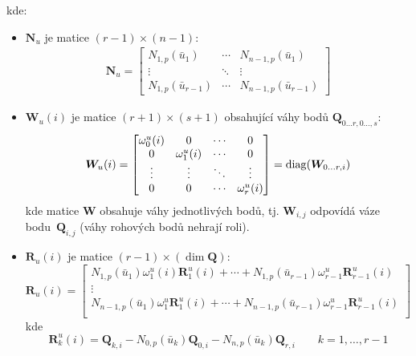 kde:
\begin{itemize}
    \item $\bm{N}_u$ je matice $(r - 1) \times (n - 1)$:
          \begin{align}
              \bm{N}_u = \begin{bmatrix}
                             N_{1,p}(\bar{u}_1)        & \cdots & N_{n-1,p}(\bar{u}_1)     \\
                             \vdots                    & \ddots & \vdots                   \\
                             N_{1, p}(\bar{u}_{r - 1}) & \cdots & N_{n-1,p}(\bar{u}_{r-1})
                         \end{bmatrix}
          \end{align}
    \item $\bm{W}_u(i)$ je matice $(r + 1)\times(s + 1)$ obsahující váhy
          bodů $\bm{Q}_{0\ldots r, 0 \ldots,s}$:
          \begin{align}
              \bm{W}_u(i)
              = \begin{bmatrix}
                    \omega^u_0(i) & 0             & \cdots & 0               \\
                    0             & \omega^u_1(i) & \cdots & 0               \\
                    \vdots        & \vdots        & \ddots & \vdots          \\
                    0             & 0             & \cdots & \omega^u_{r}(i)
                \end{bmatrix}
              = \operatorname{diag}(\bm{W}_{0\ldots r, i})
          \end{align}
          kde matice $\bm{W}$ obsahuje váhy jednotlivých bodů, tj.
          $\bm{W}_{i,j}$ odpovídá váze bodu~$\bm{Q}_{i,j}$
          (váhy rohových bodů nehrají roli).
    \item $\bm{R}_u(i)$ je matice $(r - 1) \times(\dim\bm{Q})$:
          \begin{equation}
              \bm{R}_u(i) =
              \begin{bmatrix}
                  N_{1,p}(\bar{u}_1)\omega^u_1(i)\bm{R}^u_1(i) + \cdots + N_{1, p}(\bar{u}_{r - 1})\omega^u_{r-1}\bm{R}^u_{r - 1}(i) \\
                  \vdots                                                                                                             \\
                  N_{n-1,p}(\bar{u}_1)\omega^u_1\bm{R}^u_1(i) + \cdots + N_{n-1, p}(\bar{u}_{r - 1})\omega^u_{r-1}\bm{R}^u_{r- 1}(i) \\
              \end{bmatrix}
          \end{equation}
          kde
          \begin{equation}
              \bm{R}^u_k(i)  = \bm{Q}_{k,i} - N_{0, p}(\bar{u}_k)\bm{Q}_{0,i} - N_{n,p}(\bar{u}_k)\bm{Q}_{r,i} \quad\quad k = 1, \ldots, r -1
          \end{equation}
\end{itemize}
